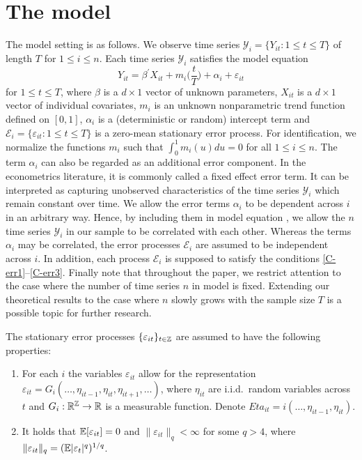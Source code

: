 \documentclass[a4paper,12pt]{article}
\makeatletter
\renewcommand{\eqref}[1]{\tagform@{\ref{#1}}}
\makeatother
\begin{document}
\section{The model}\label{sec-model}

The model setting is as follows. We observe time series $\mathcal{Y}_i = \{Y_{it}: 1 \le t \le T \}$ of length $T$ for $1 \le i \le n$. Each time series $\mathcal{Y}_i$ satisfies the model equation \begin{equation}\label{model_full}
Y_{it} = \beta^\prime X_{it} + m_i \Big( \frac{t}{T} \Big) + \alpha_i + \varepsilon_{it} 
\end{equation}
for $1 \le t \le T$, where $\beta$ is a $d \times 1$ vector of unknown parameters, $X_{it}$ is a $d\times 1$ vector of individual covariates, $m_i$ is an unknown nonparametric trend function defined on $[0,1]$, $\alpha_i$ is a (deterministic or random) intercept term and $\mathcal{E}_i = \{ \varepsilon_{it}: 1 \le t \le T \}$ is a zero-mean stationary error process. For identification, we normalize the functions $m_i$ such that $\int_0^1 m_i(u) du = 0$ for all $1 \le i \le n$. The term $\alpha_i$ can also be regarded as an additional error component. In the econometrics literature, it is commonly called a fixed effect error term. It can be interpreted as capturing unobserved characteristics of the time series $\mathcal{Y}_i$ which remain constant over time. We allow the error terms $\alpha_i$ to be dependent across $i$ in an arbitrary way. Hence, by including them in model equation \eqref{model_full}, we allow the $n$ time series $\mathcal{Y}_i$ in our sample to be correlated with each other. Whereas the terms $\alpha_i$ may be correlated, the error processes $\mathcal{E}_i$ are assumed to be independent across $i$. In addition, each process $\mathcal{E}_i$ is supposed to satisfy the conditions \ref{C-err1}--\ref{C-err3}. Finally note that throughout the paper, we restrict attention to the case where the number of time series $n$ in model \eqref{model} is fixed. Extending our theoretical results to the case where $n$ slowly grows with the sample size $T$ is a possible topic for further research.

The stationary error processes $\{\varepsilon_{it}\}_{t\in\mathbb{Z}}$ are assumed to have the following properties: 
\begin{enumerate}[label=(C\arabic*),leftmargin=1.05cm]

\item \label{C-err1} For each $i$ the variables $\varepsilon_{it}$ allow for the representation $\varepsilon_{it} = G_i(\ldots,\eta_{it-1},\eta_{it},\eta_{it+1},\ldots)$, where $\eta_{it}$ are i.i.d.\ random variables across $t$ and $G_i: \mathbb{R}^{\mathbb{Z}} \rightarrow \mathbb{R}$ is a measurable function. Denote $Eta_{it} = i(\ldots,\eta_{it-1},\eta_{it})$.

\item \label{C-err2} It holds that $\mathbb{E}[\varepsilon_{it}] =0$ and $\| \varepsilon_{it} \|_q < \infty$ for some $q > 4$, where $\| \varepsilon_{it} \|_q = (\mathbb{E}|\varepsilon_t|^q)^{1/q}$. 

\end{enumerate}
\end{document}
